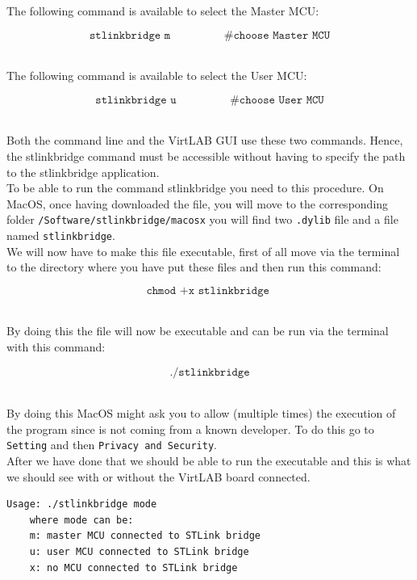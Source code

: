\documentclass[../main.tex]{subfiles}
\begin{document}
The following command is available to select the Master MCU:

\[ \texttt{stlinkbridge m} \hspace{2cm} \texttt{\#choose Master MCU} \]\


The following command is available to select the User MCU:

\[ \texttt{stlinkbridge u} \hspace{2cm} \texttt{\#choose User MCU} \]\



Both the command line and the VirtLAB GUI use these two commands. Hence, the stlinkbridge command must be accessible without having to specify the path to the stlinkbridge application.\\

To be able to run the command stlinkbridge you need to this procedure.
On MacOS, once having downloaded the file, you will move to the corresponding folder \texttt{/Software/stlinkbridge/macosx} you will find two \texttt{.dylib} file and a file named \texttt{stlinkbridge}.\\

We will now have to make this file executable, first of all move via the terminal to the directory where you have put these files and then run this command:

\[ \texttt{chmod +x stlinkbridge } \]\

By doing this the file will now be executable and can be run via the terminal with this command:

\[ \texttt{./stlinkbridge} \]\

By doing this MacOS might ask you to allow (multiple times) the execution of the program since is not coming from a known developer. To do this go to \texttt{Setting} and then \texttt{Privacy and Security}.\\

After we have done that we should be able to run the executable and this is what we should see with or without the VirtLAB board connected.\\


\begin{lstlisting}
Usage: ./stlinkbridge mode
    where mode can be:
    m: master MCU connected to STLink bridge
    u: user MCU connected to STLink bridge
    x: no MCU connected to STLink bridge
\end{lstlisting}

\vspace{0.5cm}
\end{document}
